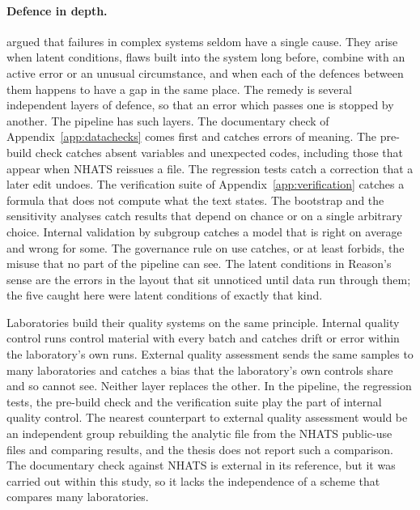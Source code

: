 \paragraph{Defence in depth.} \citet{reason_1990} argued that failures in
complex systems seldom have a single cause. They arise when latent
conditions, flaws built into the system long before, combine with an active
error or an unusual circumstance, and when each of the defences between them
happens to have a gap in the same place. The remedy is several independent
layers of defence, so that an error which passes one is stopped by another.
The pipeline has such layers. The documentary check of
Appendix~\ref{app:datachecks} comes first and catches errors of meaning. The
pre-build check catches absent variables and unexpected codes, including those
that appear when NHATS reissues a file. The regression tests catch a
correction that a later edit undoes. The verification suite of
Appendix~\ref{app:verification} catches a formula that does not compute what
the text states. The bootstrap and the sensitivity analyses catch results that
depend on chance or on a single arbitrary choice. Internal validation by
subgroup catches a model that is right on average and wrong for some. The
governance rule on use catches, or at least forbids, the misuse that no part
of the pipeline can see. The latent conditions in Reason's sense are the
errors in the layout that sit unnoticed until data run through them; the five
caught here were latent conditions of exactly that kind.

Laboratories build their quality systems on the same principle. Internal
quality control runs control material with every batch and catches drift or
error within the laboratory's own runs. External quality assessment sends the
same samples to many laboratories and catches a bias that the laboratory's own
controls share and so cannot see. Neither layer replaces the other. In the
pipeline, the regression tests, the pre-build check and the verification suite
play the part of internal quality control. The nearest counterpart to external
quality assessment would be an independent group rebuilding the analytic file
from the NHATS public-use files and comparing results, and the thesis does not
report such a comparison. The documentary check against NHATS is external in
its reference, but it was carried out within this study, so it lacks the
independence of a scheme that compares many laboratories.


